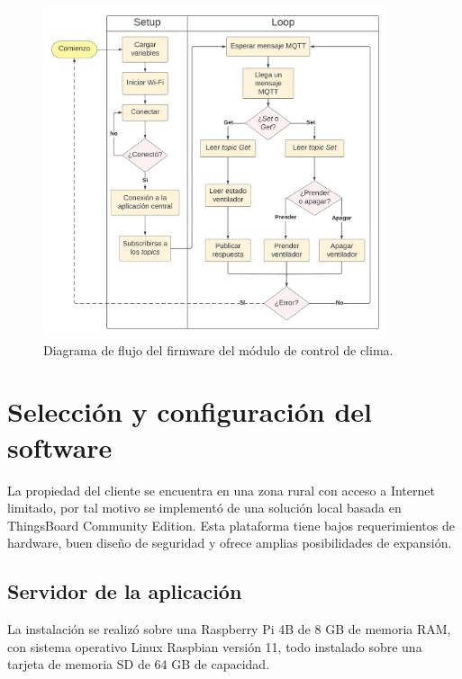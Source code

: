 \begin{figure}[!h]
	\centering
	\includegraphics[width=0.9\textwidth]{./Figures/chapter3/FirmwareVentControl.jpg}
	\caption[Diagrama de flujo del firmware del módulo de control de clima]{Diagrama de flujo del firmware del módulo de control de clima.}
	\label{fig:flow_climacontrol}
\end{figure}










\pagebreak
\section{Selección y configuración del software}
\label{sec:Selección y configuración del software}

La propiedad del cliente se encuentra en una zona rural con acceso a Internet limitado, por tal motivo se implementó de una solución local basada en  ThingsBoard Community Edition.
Esta plataforma tiene bajos requerimientos de hardware, buen diseño de seguridad y ofrece amplias posibilidades de expansión.

\subsection{Servidor de la aplicación}
\label{sec:Servidor de la aplicación}

La instalación se realizó sobre una Raspberry Pi 4B de 8 GB de memoria RAM, con sistema operativo Linux Raspbian versión 11, todo instalado sobre una tarjeta de memoria SD de 64 GB de capacidad.

